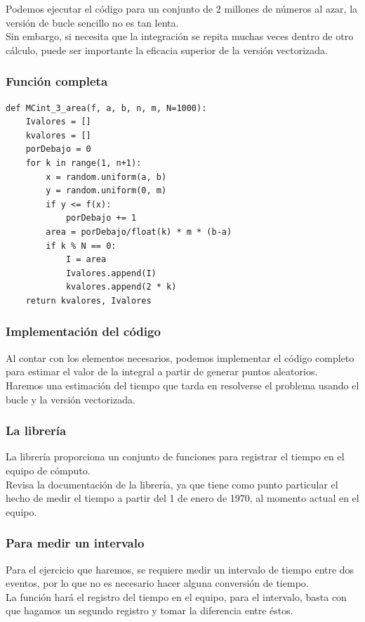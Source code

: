 \begin{frame}
Podemos ejecutar el código para un conjunto de 2 millones de números al azar, la versión de bucle sencillo no es tan lenta.
\\
\bigskip
Sin embargo, si necesita que la integración se repita muchas veces dentro de otro cálculo, puede ser importante la eficacia superior de la versión vectorizada.
\end{frame}
\begin{frame}
\frametitle{Función completa}
\begin{lstlisting}[caption=Función para el método del dardo, style=FormattedNumber, basicstyle=\linespread{1.1}\ttfamily=\small, columns=fullflexible]
def MCint_3_area(f, a, b, n, m, N=1000):
    Ivalores = []
    kvalores = []
    porDebajo = 0
    for k in range(1, n+1):
        x = random.uniform(a, b)
        y = random.uniform(0, m)
        if y <= f(x):
            porDebajo += 1
        area = porDebajo/float(k) * m * (b-a)
        if k % N == 0:
            I = area
            Ivalores.append(I)
            kvalores.append(2 * k)
    return kvalores, Ivalores
\end{lstlisting}
\end{frame}
\begin{frame}
\frametitle{Implementación del código}
Al contar con los elementos necesarios, podemos implementar el código completo para estimar el valor de la integral a partir de generar puntos aleatorios.
\\
\bigskip
Haremos una estimación del tiempo que tarda en resolverse el problema usando el bucle y la versión vectorizada.
\end{frame}
\begin{frame}
\frametitle{La librería }
La librería  proporciona un conjunto de funciones para registrar el tiempo en el equipo de cómputo.
\\
\bigskip
Revisa la documentación de la librería, ya que tiene como punto particular el hecho de medir el tiempo a partir del 1 de enero de 1970, al momento actual en el equipo.
\end{frame}
\begin{frame}
\frametitle{Para medir un intervalo}
Para el ejercicio que haremos, se requiere medir un intervalo de tiempo entre dos eventos, por lo que no es necesario hacer alguna conversión de tiempo.
\\
\bigskip
La función  hará el registro del tiempo en el equipo, para el intervalo, basta con que hagamos un segundo registro y tomar la diferencia entre éstos.
\end{frame}
